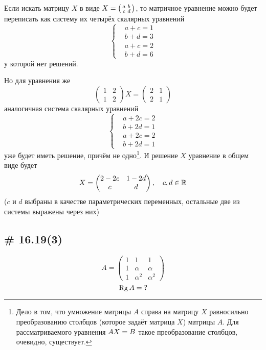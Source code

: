 \documentclass[a4paper,12pt]{article}
\begin{document}
  Если искать матрицу $X$ в виде $X \hm= \left(\begin{smallmatrix}a & b\\ c & d\end{smallmatrix}\right)$, то матричное уравнение можно будет переписать как систему их четырёх скалярных уравнений
  \[
    \left\{
      \begin{aligned}
        &a + c = 1\\
        &b + d = 3\\
        &a + c = 2\\
        &b + d = 6
      \end{aligned}
    \right.
  \]
  у которой нет решений.
  
  Но для уравнения же
  \[
    \begin{pmatrix}
      1 & 2\\
      1 & 2
    \end{pmatrix} X = \begin{pmatrix}
      2 & 1\\
      2 & 1
    \end{pmatrix}
  \]
  аналогичная система скалярных уравнений
  \[
    \left\{
      \begin{aligned}
        &a + 2c = 2\\
        &b + 2d = 1\\
        &a + 2c = 2\\
        &b + 2d = 1
      \end{aligned}
    \right.
  \]
  уже будет иметь решение, причём не одно\footnote{Дело в том, что умножение матрицы $A$ справа на матрицу $X$ равносильно преобразованию столбцов (которое задаёт матрица $X$) матрицы $A$. Для рассматриваемого уравнения $AX \hm= B$ такое преобразование столбцов, очевидно, существует.}. И решение $X$ уравнение в общем виде будет
  \[
    X \hm= \begin{pmatrix}
      2 - 2c & 1 - 2d\\
      c & d
    \end{pmatrix},\quad c, d \in \RR
  \]
  ($c$ и $d$ выбраны в качестве параметрических переменных, остальные две из системы выражены через них)
  
  
  \subsection{\# 16.19(3)}
  
  \[
    A = \begin{pmatrix}
      1 & 1 & 1\\
      1 & \alpha & \alpha\\
      1 & \alpha^2 & \alpha^2
    \end{pmatrix}
  \]
  \[
    \operatorname{Rg} A = \operatorname{?}
  \]
  
\end{document}
